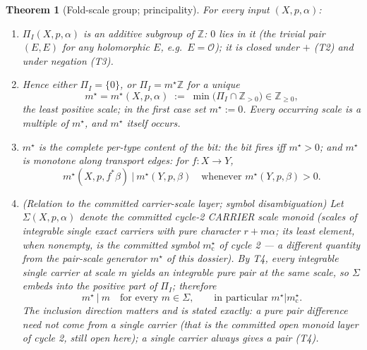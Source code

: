 \documentclass[11pt]{article}
\newtheorem{theorem}{Theorem}[section]
\newcommand{\Oo}{\mathcal{O}}
\newcommand{\Z}{\mathbb{Z}}
\begin{document}
\begin{theorem}[Fold-scale group; principality]
\label{thm:M}
For every input $(X,p,\alpha)$:
\begin{enumerate}
\item[\textup{(i)}] $\Pi_I(X,p,\alpha)$ is an additive subgroup of $\Z$:
$0$ lies in it (the trivial pair $(E,E)$ for any holomorphic $E$, e.g.\
$E=\Oo$); it is closed under $+$ (T2) and under negation (T3).
\item[\textup{(ii)}] Hence either $\Pi_I=\{0\}$, or
$\Pi_I=m^\star\Z$ for a unique
\[
m^\star=m^\star(X,p,\alpha)\;:=\;\min\bigl(\Pi_I\cap\Z_{>0}\bigr)\in\Z_{\ge0},
\]
the least positive scale; in the first case set $m^\star:=0$.  Every
occurring scale is a multiple of $m^\star$, and $m^\star$ itself occurs.
\item[\textup{(iii)}] $m^\star$ is the complete per-type content of the bit:
the bit fires iff $m^\star>0$; and $m^\star$ is monotone along transport
edges: for $f\colon X\to Y$,
\[
m^\star(X,p,f^*\beta)\ \big|\ m^\star(Y,p,\beta)
\quad\text{whenever } m^\star(Y,p,\beta)>0 .
\]
\item[\textup{(iv)}] \emph{(Relation to the committed carrier-scale layer;
symbol disambiguation)} Let $\Sigma(X,p,\alpha)$ denote the committed
cycle-2 CARRIER scale monoid (scales of integrable single exact carriers with
pure character $r+m\alpha$; its least element, when nonempty, is the
committed symbol $m^\star_{\mathrm c}$ of cycle 2 --- a different quantity
from the pair-scale generator $m^\star$ of this dossier).  By T4, every
integrable single carrier at scale $m$ yields an integrable pure pair at the
same scale, so $\Sigma$ embeds into the positive part of $\Pi_I$; therefore
\[
m^\star \ \big|\ m \quad\text{for every } m\in\Sigma,
\qquad\text{in particular } m^\star \big| m^\star_{\mathrm c} .
\]
The inclusion direction matters and is stated exactly: a pure pair difference
need not come from a single carrier (that is the committed open monoid layer
of cycle 2, still open here); a single carrier always gives a pair (T4).
\end{enumerate}
\end{theorem}
\end{document}
